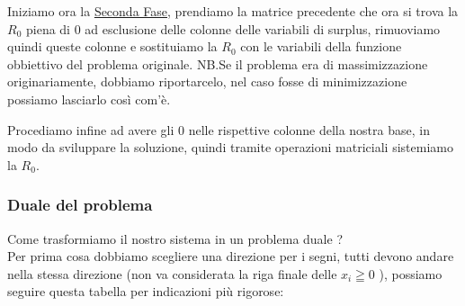 \documentclass{article}
\begin{document}
Iniziamo ora la \underline{Seconda Fase}, prendiamo la matrice precedente che ora si trova la $R_0$ piena di 0 ad esclusione delle colonne delle variabili di surplus, rimuoviamo quindi queste colonne e sostituiamo la $R_0$ con le variabili della funzione obbiettivo del problema originale.
NB.Se il problema era di massimizzazione originariamente, dobbiamo riportarcelo, nel caso fosse di minimizzazione possiamo lasciarlo così com'è.\\
\begin{center}
\end{center}

Procediamo infine ad avere gli 0 nelle rispettive colonne della nostra base, in modo da sviluppare la soluzione, quindi tramite operazioni matriciali sistemiamo la $R_0$.\\

\begin{center}
\end{center}

\subsubsection{Duale del problema}
Come trasformiamo il nostro sistema in un problema duale ?\\
Per prima cosa dobbiamo scegliere una direzione per i segni, tutti devono andare nella stessa direzione (non va considerata la riga finale delle $x_i \geqq 0$ ), possiamo seguire questa tabella per indicazioni più rigorose:\\
\end{document}
